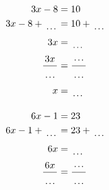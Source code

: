 \documentclass[12pt]{article}
\newcounter{minipagecount}
\begin{document}
\begin{multicols}{2}
\begin{minipage}[t]{0.45\textwidth}
    \raggedright %
    \begin{align*} %
        3x - 8 &= 10\\
        3x - 8 + \dotuline{\hspace{5mm}} &= 10 + \dotuline{\hspace{5mm}}\\
        3x &= \dotuline{\hspace{5mm}}\\
        \frac{3x}{\dotuline{\hspace{5mm}}} &= \frac{\dotuline{\hspace{5mm}}}{\dotuline{\hspace{5mm}}}\\
        x &= \dotuline{\hspace{5mm}}\\
    \end{align*}
\end{minipage} %
\noindent{(\theminipagecount)}\hspace{0.1mm} %
\begin{minipage}[t]{0.45\textwidth} %
    \vspace{-26pt}  %
    \raggedright %
    \begin{align*} %
        6x - 1 &= 23\\
        6x - 1 + \dotuline{\hspace{5mm}} &= 23 + \dotuline{\hspace{5mm}}\\
        6x &= \dotuline{\hspace{5mm}}\\
        \frac{6x}{\dotuline{\hspace{5mm}}} &= \frac{\dotuline{\hspace{5mm}}}{\dotuline{\hspace{5mm}}}\\

\end{align*}
\end{minipage}
\end{multicols}
\end{document}
